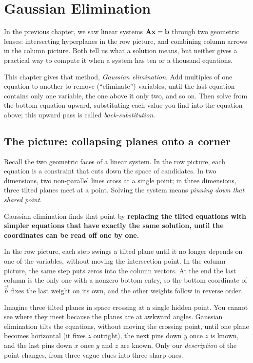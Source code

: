 \chapter{Gaussian Elimination}

In the previous chapter, we saw linear systems $\mathbf{A}\mathbf{x}=\mathbf{b}$ through
two geometric lenses: intersecting hyperplanes in the row picture, and combining
column arrows in the column picture. Both tell us what a solution means, but neither
gives a practical way to compute it when a system has ten or a thousand equations.

This chapter gives that method, \emph{Gaussian elimination}. Add multiples of
one equation to another to remove (``eliminate'') variables, until the last
equation contains only one variable, the one above it only two, and so on. Then
solve from the bottom equation upward, substituting each value you find into the
equation above; this upward pass is called \emph{back-substitution}.

\section{The picture: collapsing planes onto a corner}

Recall the two geometric faces of a linear system. In the row picture, each
equation is a constraint that cuts down the space of candidates. In two dimensions,
two non-parallel lines cross at a single point; in three dimensions, three tilted
planes meet at a point. Solving the system means \emph{pinning down that shared point}.

Gaussian elimination finds that point by
\textbf{replacing the tilted equations with simpler equations
that have exactly the same solution, until the coordinates can be read off one by one.}

In the row picture, each step swings a tilted plane until it no longer depends on
one of the variables, without moving the intersection point. In the column
picture, the same step puts zeros into the column vectors. At the end the last
column is the only one with a nonzero bottom entry, so the bottom coordinate of
$\vec{b}$ fixes the last weight on its own, and the other weights follow in
reverse order.

\begin{intuitionbox}
Imagine three tilted planes in space crossing at a single hidden point. You
cannot see where they meet because the planes are at awkward angles. Gaussian
elimination tilts the equations, without moving the
crossing point, until one plane becomes horizontal (it fixes $z$ outright),
the next pins down $y$ once $z$ is known, and the last pins down $x$ once $y$ and
$z$ are known. Only our \emph{description} of the point changes, from three
vague clues into three sharp ones.
\end{intuitionbox}

